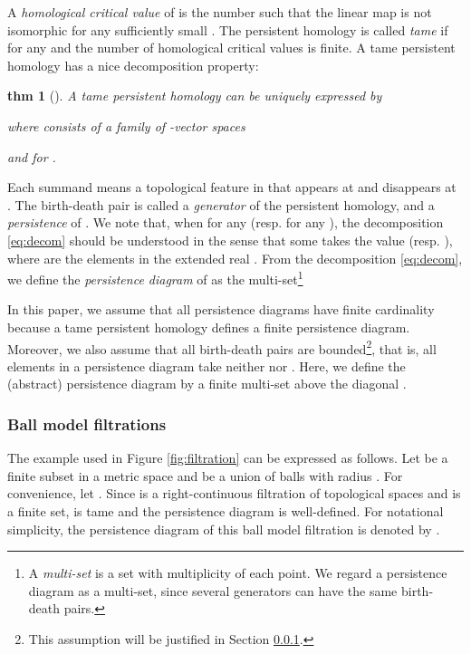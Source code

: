 \documentclass{article}
\newtheorem{thm}{thm}[section]
\begin{document}
A {\em homological critical value} of  is the number  such that the linear map  is not isomorphic for any sufficiently small .
The persistent homology  is called {\em tame} if  for any  and the number of homological critical values is finite. A tame persistent homology  has a nice decomposition property:
\begin{thm}[\cite{ZC05}]\label{thm:decomposition}
A tame persistent homology can be uniquely expressed by

where  consists of a family of -vector spaces

and  for .
\end{thm}

Each summand  means a topological feature in  that appears at  and disappears at .
The birth-death pair  is called a {\em generator} of the persistent homology, and  a {\em persistence} of .
We note that, when  for any  (resp. for any ), the decomposition \eqref{eq:decom} should be understood in the sense that some  takes the value  (resp. ), where  are the elements in the extended real .
From the decomposition \eqref{eq:decom}, we define the {\em persistence diagram} of  as the multi-set\footnote{A {\em multi-set} is a set with multiplicity of each point.
We regard a persistence diagram as a multi-set, since several generators can have the same birth-death pairs.}


In this paper, we assume that all persistence diagrams have finite cardinality because a tame persistent homology defines a finite persistence diagram.
Moreover, we also assume that all birth-death pairs are bounded\footnote{This assumption will be justified in Section \ref{subsec:geometrical}.}, that is, all elements in a persistence diagram take neither  nor .
Here, we define the (abstract) persistence diagram  by a finite multi-set above the diagonal .

\subsubsection{Ball model filtrations}
\label{subsec:geometrical}

The example used in Figure \ref{fig:filtration} can be expressed as follows.
Let  be a finite subset in a metric space  and  be a union of balls  with radius .
For convenience, let .
Since  is a right-continuous filtration of topological spaces and  is a finite set,  is tame and the persistence diagram  is well-defined.
For notational simplicity, the persistence diagram of this ball model filtration is denoted by .
\end{document}
